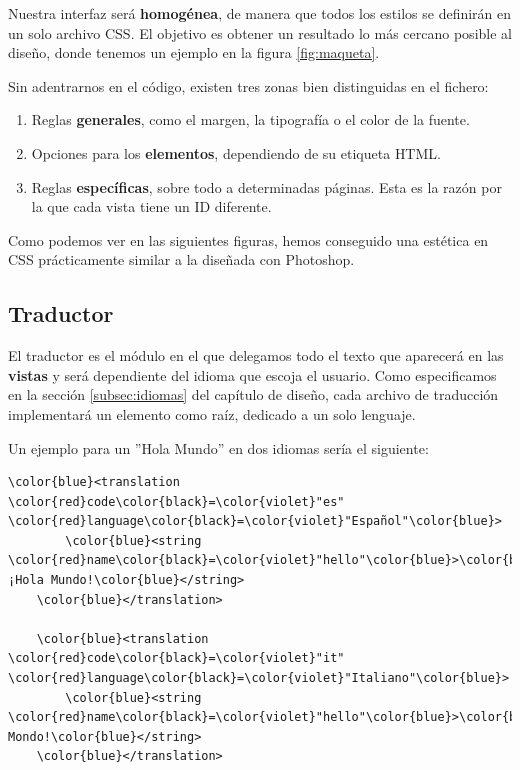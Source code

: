 Nuestra interfaz será \textbf{homogénea}, de manera que todos los estilos se definirán en un solo archivo \acrshort{CSS}. El objetivo es obtener un resultado lo más cercano posible al diseño, donde tenemos un ejemplo en la figura \ref{fig:maqueta}.

Sin adentrarnos en el código, existen tres zonas bien distinguidas en el fichero:

\begin{enumerate}
	\item Reglas \textbf{generales}, como el margen, la tipografía o el color de la fuente.
	\item Opciones para los \textbf{elementos}, dependiendo de su etiqueta \acrshort{HTML}.
	\item Reglas \textbf{específicas}, sobre todo a determinadas páginas. Esta es la razón por la que cada vista tiene un ID diferente.
\end{enumerate}

Como podemos ver en las siguientes figuras, hemos conseguido una estética en \acrshort{CSS} prácticamente similar a la diseñada con Photoshop.

\subsection{Traductor}

El traductor es el módulo en el que delegamos todo el texto que aparecerá en las \textbf{vistas} y será dependiente del idioma que escoja el usuario. Como especificamos en la sección \ref{subsec:idiomas} del capítulo de diseño, cada archivo de traducción implementará un elemento  como raíz, dedicado a un solo lenguaje.

Un ejemplo para un ''Hola Mundo'' en dos idiomas sería el siguiente:

\begin{Verbatim}[commandchars=\\\{\}]
	\color{blue}<translation \color{red}code\color{black}=\color{violet}"es" \color{red}language\color{black}=\color{violet}"Español"\color{blue}>
	    \color{blue}<string \color{red}name\color{black}=\color{violet}"hello"\color{blue}>\color{black}¡Hola Mundo!\color{blue}</string>
	\color{blue}</translation>

	\color{blue}<translation \color{red}code\color{black}=\color{violet}"it" \color{red}language\color{black}=\color{violet}"Italiano"\color{blue}>
		\color{blue}<string \color{red}name\color{black}=\color{violet}"hello"\color{blue}>\color{black}Ciao Mondo!\color{blue}</string>
	\color{blue}</translation>
\end{Verbatim}

